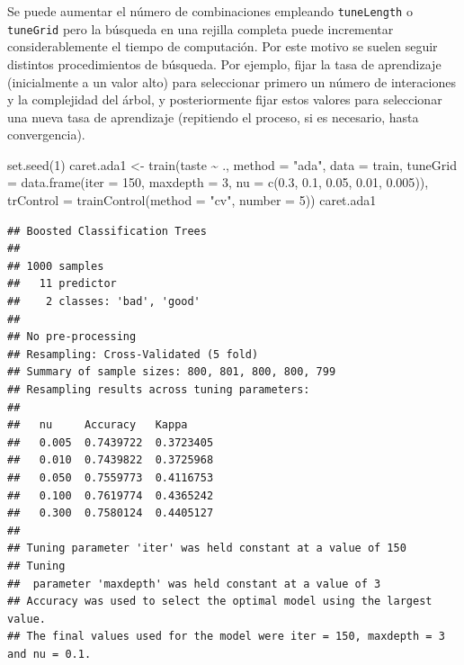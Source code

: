 \documentclass[
  spanish,
]{book}
\newenvironment{Shaded}{\begin{snugshade}}{\end{snugshade}}
\newcommand{\AttributeTok}[1]{\textcolor[rgb]{0.77,0.63,0.00}{#1}}
\newcommand{\DecValTok}[1]{\textcolor[rgb]{0.00,0.00,0.81}{#1}}
\newcommand{\FloatTok}[1]{\textcolor[rgb]{0.00,0.00,0.81}{#1}}
\newcommand{\FunctionTok}[1]{\textcolor[rgb]{0.00,0.00,0.00}{#1}}
\newcommand{\NormalTok}[1]{#1}
\newcommand{\OtherTok}[1]{\textcolor[rgb]{0.56,0.35,0.01}{#1}}
\newcommand{\SpecialCharTok}[1]{\textcolor[rgb]{0.00,0.00,0.00}{#1}}
\newcommand{\StringTok}[1]{\textcolor[rgb]{0.31,0.60,0.02}{#1}}
\theoremstyle{break}
\theoremstyle{definition}
\theoremstyle{definition}
\theoremstyle{definition}
\theoremstyle{definition}
\theoremstyle{remark}
\begin{document}
Se puede aumentar el número de combinaciones empleando \texttt{tuneLength} o \texttt{tuneGrid} pero la búsqueda en una rejilla completa puede incrementar considerablemente el tiempo de computación.
Por este motivo se suelen seguir distintos procedimientos de búsqueda. Por ejemplo, fijar la tasa de aprendizaje (inicialmente a un valor alto) para seleccionar primero un número de interaciones y la complejidad del árbol, y posteriormente fijar estos valores para seleccionar una nueva tasa de aprendizaje (repitiendo el proceso, si es necesario, hasta convergencia).

\begin{Shaded}
\begin{Highlighting}[]
\FunctionTok{set.seed}\NormalTok{(}\DecValTok{1}\NormalTok{)}
\NormalTok{caret.ada1 }\OtherTok{\textless{}{-}} \FunctionTok{train}\NormalTok{(taste }\SpecialCharTok{\textasciitilde{}}\NormalTok{ ., }\AttributeTok{method =} \StringTok{"ada"}\NormalTok{, }\AttributeTok{data =}\NormalTok{ train,}
                    \AttributeTok{tuneGrid =} \FunctionTok{data.frame}\NormalTok{(}\AttributeTok{iter =}  \DecValTok{150}\NormalTok{, }\AttributeTok{maxdepth =} \DecValTok{3}\NormalTok{,}
                                 \AttributeTok{nu =} \FunctionTok{c}\NormalTok{(}\FloatTok{0.3}\NormalTok{, }\FloatTok{0.1}\NormalTok{, }\FloatTok{0.05}\NormalTok{, }\FloatTok{0.01}\NormalTok{, }\FloatTok{0.005}\NormalTok{)),}
                   \AttributeTok{trControl =} \FunctionTok{trainControl}\NormalTok{(}\AttributeTok{method =} \StringTok{"cv"}\NormalTok{, }\AttributeTok{number =} \DecValTok{5}\NormalTok{))}
\NormalTok{caret.ada1}
\end{Highlighting}
\end{Shaded}

\begin{verbatim}
## Boosted Classification Trees 
## 
## 1000 samples
##   11 predictor
##    2 classes: 'bad', 'good' 
## 
## No pre-processing
## Resampling: Cross-Validated (5 fold) 
## Summary of sample sizes: 800, 801, 800, 800, 799 
## Resampling results across tuning parameters:
## 
##   nu     Accuracy   Kappa    
##   0.005  0.7439722  0.3723405
##   0.010  0.7439822  0.3725968
##   0.050  0.7559773  0.4116753
##   0.100  0.7619774  0.4365242
##   0.300  0.7580124  0.4405127
## 
## Tuning parameter 'iter' was held constant at a value of 150
## Tuning
##  parameter 'maxdepth' was held constant at a value of 3
## Accuracy was used to select the optimal model using the largest value.
## The final values used for the model were iter = 150, maxdepth = 3 and nu = 0.1.
\end{verbatim}
\end{document}

